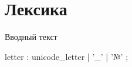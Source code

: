 \hypertarget{lexica}{%
\section{Лексика}\label{lex:chapter}}


Вводный текст

\begin{Grammar}
letter
    : unicode_letter
    | '_'
    | '№'
    ;
\end{Grammar}